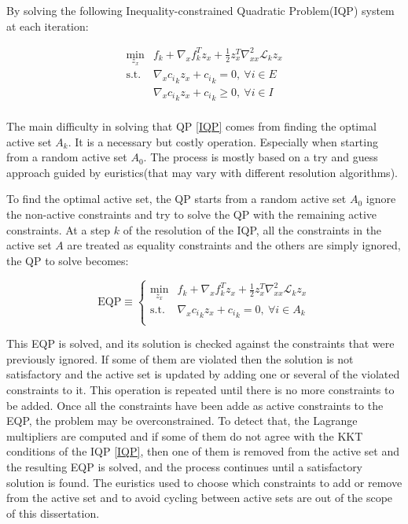 By solving the following Inequality-constrained Quadratic Problem(IQP) system at each iteration:

\begin{equation}
  \label{IQP}
  \begin{array}{ll}
    \min\limits_{z_x} &f_k + \nabla_x f_k ^T z_x + \frac{1}{2} z_x^T\nabla_{xx}^2\mathcal{L}_k z_x \\
    \text{s.t.} & \nabla_x {c_i}_k z_x + {c_i}_k = 0 ,\ \forall i\in E\\
                & \nabla_x {c_i}_k z_x + {c_i}_k \geq 0 ,\ \forall i\in I\\
  \end{array}
\end{equation}

The main difficulty in solving that QP \ref{IQP} comes from finding the optimal active set $\mathit{A}_k$.
It is a necessary but costly operation.
Especially when starting from a random active set $\mathit{A}_0$.
The process is mostly based on a try and guess approach guided by euristics(that may vary with different resolution algorithms).

To find the optimal active set, the QP starts from a random active set $\mathit{A}_0$ ignore the non-active constraints and try to solve the QP with the remaining active constraints.
At a step $k$ of the resolution of the IQP, all the constraints in the active set $\mathit{A}$ are treated as equality constraints and the others are simply ignored, the QP to solve becomes:

\begin{equation}
  \text{EQP} \equiv \left\{
  \begin{array}{ll}
    \min\limits_{z_x} &f_k + \nabla_x f_k ^T z_x + \frac{1}{2} z_x^T\nabla_{xx}^2\mathcal{L}_k z_x \\
    \text{s.t.} & \nabla_x {c_i}_k z_x + {c_i}_k = 0 ,\ \forall i\in \mathit{A}_k\\
  \end{array}
  \right.
\end{equation}

This EQP is solved, and its solution is checked against the constraints that were previously ignored.
If some of them are violated then the solution is not satisfactory and the active set is updated by adding one or several of the violated constraints to it.
This operation is repeated until there is no more constraints to be added.
Once all the constraints have been adde as active constraints to the EQP, the problem may be overconstrained.
To detect that, the Lagrange multipliers are computed and if some of them do not agree with the KKT conditions of the IQP \ref{IQP}, then one of them is removed from the active set and the resulting EQP is solved, and the process continues until a satisfactory solution is found.
The euristics used to choose which constraints to add or remove from the active set and to avoid cycling between active sets are out of the scope of this dissertation.

